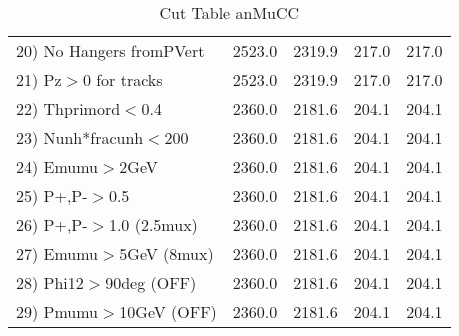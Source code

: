 \begin{table}[h!]
\begin{tabular}{||l||r|r|r|r||}
 20) No Hangers fromPVert &      2523.0 &      2319.9 &       217.0 &       217.0 \\
 21) Pz$>$0 for tracks    &      2523.0 &      2319.9 &       217.0 &       217.0 \\
 22) Thprimord$<$0.4      &      2360.0 &      2181.6 &       204.1 &       204.1 \\
 23) Nunh*fracunh$<$200   &      2360.0 &      2181.6 &       204.1 &       204.1 \\
 24) Emumu$>$2GeV         &      2360.0 &      2181.6 &       204.1 &       204.1 \\
 25) P+,P-$>$0.5          &      2360.0 &      2181.6 &       204.1 &       204.1 \\
 26) P+,P-$>$1.0 (2.5mux) &      2360.0 &      2181.6 &       204.1 &       204.1 \\
 27) Emumu$>$5GeV  (8mux) &      2360.0 &      2181.6 &       204.1 &       204.1 \\
 28) Phi12$>$90deg  (OFF) &      2360.0 &      2181.6 &       204.1 &       204.1 \\
 29) Pmumu$>$10GeV  (OFF) &      2360.0 &      2181.6 &       204.1 &       204.1 \\
 \hline
 \hline
 \end{tabular}
 \caption{Cut Table  anMuCC }
 \label{tab-cut_anmcc}
 \end{table}
